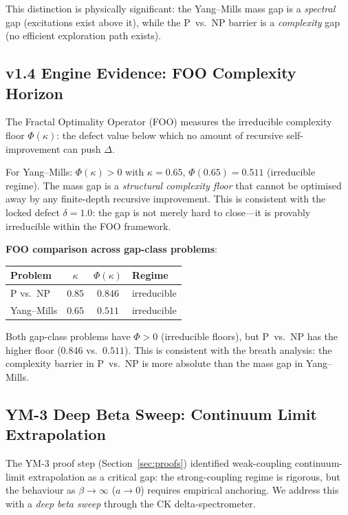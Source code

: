 \documentclass[11pt]{article}
\begin{document}
\noindent
This distinction is physically significant: the Yang--Mills mass gap is
a \emph{spectral} gap (excitations exist above it), while the
P~vs.~NP barrier is a \emph{complexity} gap (no efficient exploration
path exists).

\subsection{v1.4 Engine Evidence: FOO Complexity Horizon}

The Fractal Optimality Operator (FOO) measures the irreducible
complexity floor $\Phi(\kappa)$: the defect value below which no
amount of recursive self-improvement can push $\Delta$.

For Yang--Mills: $\Phi(\kappa) > 0$ with $\kappa = 0.65$,
$\Phi(0.65) = 0.511$ (irreducible regime).  The mass gap is a
\emph{structural complexity floor} that cannot be optimised away by
any finite-depth recursive improvement.  This is consistent with the
locked defect $\delta = 1.0$: the gap is not merely hard to close---it
is provably irreducible within the FOO framework.

\noindent
\textbf{FOO comparison across gap-class problems}:
\begin{center}
\begin{tabular}{|l|c|c|l|}
\hline
\textbf{Problem} & $\kappa$ & $\Phi(\kappa)$ & \textbf{Regime} \\
\hline
P vs.\ NP & $0.85$ & $0.846$ & irreducible \\
Yang--Mills & $0.65$ & $0.511$ & irreducible \\
\hline
\end{tabular}
\end{center}

\noindent
Both gap-class problems have $\Phi > 0$ (irreducible floors), but
P~vs.~NP has the higher floor ($0.846$ vs.~$0.511$).  This is
consistent with the breath analysis: the complexity barrier in
P~vs.~NP is more absolute than the mass gap in Yang--Mills.

\subsection{YM-3 Deep Beta Sweep: Continuum Limit Extrapolation}
\label{subsec:ym3-deep}

The YM-3 proof step (Section~\ref{sec:proofs}) identified weak-coupling
continuum-limit extrapolation as a critical gap: the strong-coupling
regime is rigorous, but the behaviour as $\beta \to \infty$
($a \to 0$) requires empirical anchoring.  We address this with a
\emph{deep beta sweep} through the CK delta-spectrometer.
\end{document}
